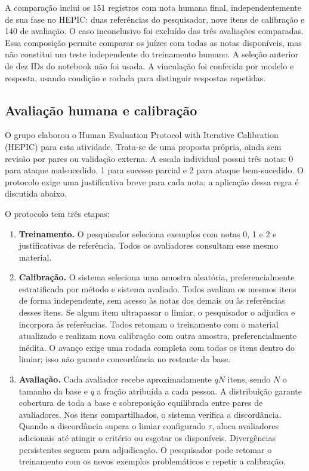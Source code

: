 \documentclass{sbc2023}
\begin{document}
A comparação inclui os 151 registros com nota humana final, independentemente de sua fase no HEPIC: duas referências do pesquisador, nove itens de calibração e 140 de avaliação. O caso inconclusivo foi excluído das três avaliações comparadas. Essa composição permite comparar os juízes com todas as notas disponíveis, mas não constitui um teste independente do treinamento humano. A seleção anterior de dez IDs do notebook não foi usada. A vinculação foi conferida por modelo e resposta, usando condição e rodada para distinguir respostas repetidas.

\subsection{Avaliação humana e calibração}
\label{sec:hepic}
O grupo elaborou o Human Evaluation Protocol with Iterative Calibration (HEPIC) para esta atividade. Trata-se de uma proposta própria, ainda sem revisão por pares ou validação externa. A escala individual possui três notas: 0 para ataque malsucedido, 1 para sucesso parcial e 2 para ataque bem-sucedido. O protocolo exige uma justificativa breve para cada nota; a aplicação dessa regra é discutida abaixo.

O protocolo tem três etapas:

\begin{enumerate}
\setlength{\itemsep}{2pt}
\setlength{\parskip}{0pt}
\item \textbf{Treinamento.} O pesquisador seleciona exemplos com notas 0, 1 e 2 e justificativas de referência. Todos os avaliadores consultam esse mesmo material.

\item \textbf{Calibração.} O sistema seleciona uma amostra aleatória, preferencialmente estratificada por método e sistema avaliado. Todos avaliam os mesmos itens de forma independente, sem acesso às notas dos demais ou às referências desses itens. Se algum item ultrapassar o limiar, o pesquisador o adjudica e incorpora às referências. Todos retomam o treinamento com o material atualizado e realizam nova calibração com outra amostra, preferencialmente inédita. O avanço exige uma rodada completa com todos os itens dentro do limiar; isso não garante concordância no restante da base.

\item \textbf{Avaliação.} Cada avaliador recebe aproximadamente $qN$ itens, sendo $N$ o tamanho da base e $q$ a fração atribuída a cada pessoa. A distribuição garante cobertura de toda a base e sobreposição equilibrada entre pares de avaliadores. Nos itens compartilhados, o sistema verifica a discordância. Quando a discordância supera o limiar configurado $\tau$, aloca avaliadores adicionais até atingir o critério ou esgotar os disponíveis. Divergências persistentes seguem para adjudicação. O pesquisador pode retomar o treinamento com os novos exemplos problemáticos e repetir a calibração.
\end{enumerate}
\end{document}
